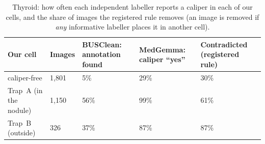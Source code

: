 \begin{table}[H]\centering\scriptsize
\caption{Thyroid: how often each independent labeller reports a caliper in each of our cells, and the share of images the registered rule removes (an image is removed if \emph{any} informative labeller places it in another cell).}\label{tab:s16thylab}
\begin{tabular}{p{3.4cm}p{1.4cm}p{2.8cm}p{2.8cm}p{2.8cm}}\toprule
Our cell & Images & BUSClean: annotation found & MedGemma: caliper ``yes'' & Contradicted (registered rule) \\\midrule
caliper-free & 1{,}801 & 5\% & 29\% & 30\% \\
Trap~A (in the nodule) & 1{,}150 & 56\% & 99\% & 61\% \\
Trap~B (outside) & 326 & 37\% & 87\% & 87\% \\
\bottomrule\end{tabular}
\end{table}
